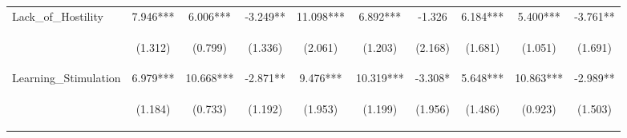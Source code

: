 \begin{tabular}{lccccccccc}
\noalign{\smallskip}Lack_of_Hostility & 7.946*** & 6.006*** & -3.249** & 11.098*** & 6.892*** & -1.326 & 6.184*** & 5.400*** & -3.761**\\
 & \begin{footnotesize}(1.312)\end{footnotesize} & \begin{footnotesize}(0.799)\end{footnotesize} & \begin{footnotesize}(1.336)\end{footnotesize} & \begin{footnotesize}(2.061)\end{footnotesize} & \begin{footnotesize}(1.203)\end{footnotesize} & \begin{footnotesize}(2.168)\end{footnotesize} & \begin{footnotesize}(1.681)\end{footnotesize} & \begin{footnotesize}(1.051)\end{footnotesize} & \begin{footnotesize}(1.691)\end{footnotesize}\\
\noalign{\smallskip}Learning_Stimulation & 6.979*** & 10.668*** & -2.871** & 9.476*** & 10.319*** & -3.308* & 5.648*** & 10.863*** & -2.989**\\
 & \begin{footnotesize}(1.184)\end{footnotesize} & \begin{footnotesize}(0.733)\end{footnotesize} & \begin{footnotesize}(1.192)\end{footnotesize} & \begin{footnotesize}(1.953)\end{footnotesize} & \begin{footnotesize}(1.199)\end{footnotesize} & \begin{footnotesize}(1.956)\end{footnotesize} & \begin{footnotesize}(1.486)\end{footnotesize} & \begin{footnotesize}(0.923)\end{footnotesize} & \begin{footnotesize}(1.503)\end{footnotesize}\\

\end{tabular}
